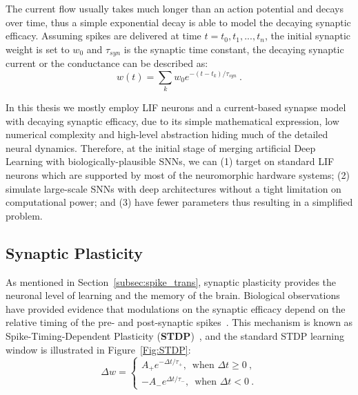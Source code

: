 The current flow usually takes much longer than an action potential and decays over time, thus a simple exponential decay is able to model the decaying synaptic efficacy.
Assuming spikes are delivered at time $t={t_0, t_1, ..., t_n}$, the initial synaptic weight is set to $w_0$ and $\tau_{syn}$ is the synaptic time constant, the decaying synaptic current or the conductance can be described as:
\begin{equation}
w(t) = \sum_k w_0 e^{-(t-t_k)/\tau_{syn}}~.
\end{equation}

In this thesis we mostly employ LIF neurons and a current-based synapse model with decaying synaptic efficacy, due to its simple mathematical expression, low numerical complexity and high-level abstraction hiding much of the detailed neural dynamics.
Therefore, at the initial stage of merging artificial Deep Learning with biologically-plausible SNNs, we can (1) target on standard LIF neurons which are supported by most of the neuromorphic hardware systems; (2) simulate large-scale SNNs with deep architectures without a tight limitation on computational power; and (3) have fewer parameters thus resulting in a simplified problem.


\subsection{Synaptic Plasticity}
\label{subsec:STDP}
As mentioned in Section~\ref{subsec:spike_trans}, synaptic plasticity provides the neuronal level of learning and the memory of the brain.
Biological observations have provided evidence that modulations on the synaptic efficacy depend on the relative timing of the pre- and post-synaptic spikes~\citep{bi1998synaptic}.
This mechanism is known as Spike-Timing-Dependent Plasticity (\textbf{STDP})~\citep{song2000competitive}, and the standard STDP learning window is illustrated in Figure~\ref{Fig:STDP}:
\begin{equation}
\Delta w = \left\{
\begin{aligned}
A_+ e^{-\Delta t/\tau_+} \textrm{,~~when~} \Delta t \geq 0~, \\
{-A}_- e^{\Delta t/\tau_-} \textrm{,~~when~} \Delta t < 0~.
\end{aligned}
\right.
\label{equ:stdp}
\end{equation}

